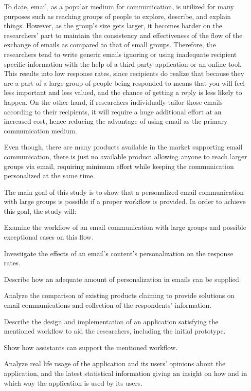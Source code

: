 To date, email, as a popular medium for communication, is utilized for many purposes such as reaching groups of people to explore, describe, and explain things. However, as the group's size gets larger, it becomes harder on the researchers' part to maintain the consistency and effectiveness of the flow of the exchange of emails as compared to that of small groups. Therefore, the researchers tend to write generic emails ignoring or using inadequate recipient specific information with the help of a third-party application or an online tool. This results into low response rates, since recipients do realize that because they are a part of a large group of people being responded to means that you will feel less important and less valued, and the chance of getting a reply is less likely to happen. On the other hand, if researchers individually tailor those emails according to their recipients, it will require a huge additional effort at an increased cost, hence reducing the advantage of using email as the primary communication medium.
\vspace{1cm}

Even though, there are many products available in the market supporting email communication, there is just no available product allowing anyone to reach larger groups via email, requiring minimum effort while keeping the communication personalized at the same time.
\vspace{1cm}

The main goal of this study is to show that a personalized email communication with large groups is possible if a proper workflow is provided. In order to achieve this goal, the study will:

\begin{compactenum}
	\item Examine the workflow of an email communication with large groups and possible exceptional cases on this flow.
	\item Investigate the effects of an email's content's personalization on the response rates.
	\item Describe how an adequate amount of personalization in emails can be supplied.
	\item Analyze the comparison of existing products claiming to provide solutions on email communications and collection of the respondents' information.
	\item Describe the design and implementation of an application satisfying the mentioned workflow to aid the researchers, including the initial prototype.
	\item Show how assistants can support the mentioned workflow. 
	\item Analyze real life usage of the application and its users' opinions about the application, and the latest statistical information giving an insight on how and in which way the application is used by its users.
\end{compactenum}
\vspace{1cm}

